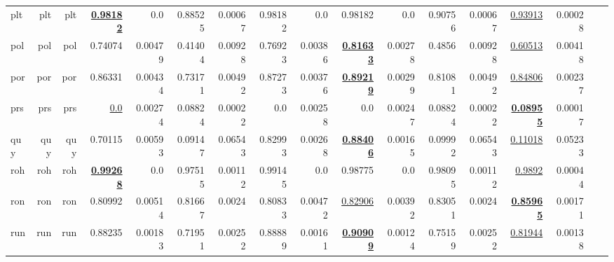 \documentclass[11pt]{article}
\begin{document}
\begin{table*}[h]
{\begin{tabular}{lrrrrrrrrrrrrrrrr}
plt         & plt         & plt         & \textbf{\underline{0.98182}}         & 0.0         & 0.88525         & 0.00067         & 0.98182         & 0.0         & 0.98182         & 0.0         & 0.90756         & 0.00067         & \underline{0.93913}         & 0.00028         \\
pol         & pol         & pol         & 0.74074         & 0.00479         & 0.41404         & 0.00928         & 0.76923         & 0.00386         & \textbf{\underline{0.81633}}         & 0.00278         & 0.4856         & 0.00928         & \underline{0.60513}         & 0.00418         \\
por         & por         & por         & 0.86331         & 0.00434         & 0.73171         & 0.00492         & 0.87273         & 0.00376         & \textbf{\underline{0.89219}}         & 0.00299         & 0.81081         & 0.00492         & \underline{0.84806}         & 0.00237         \\
prs         & prs         & prs         & \underline{0.0}         & 0.00274         & 0.08824         & 0.00022         & 0.0         & 0.00258         & 0.0         & 0.00247         & 0.08824         & 0.00022         & \textbf{\underline{0.08955}}         & 0.00017         \\
quy         & quy         & quy         & 0.70115         & 0.00593         & 0.09147         & 0.06543         & 0.82993         & 0.00268         & \textbf{\underline{0.88406}}         & 0.00165         & 0.09992         & 0.06543         & \underline{0.11018}         & 0.05233         \\
roh         & roh         & roh         & \textbf{\underline{0.99268}}         & 0.0         & 0.97515         & 0.00112         & 0.99145         & 0.0         & 0.98775         & 0.0         & 0.98095         & 0.00112         & \underline{0.9892}         & 0.00044         \\
ron         & ron         & ron         & 0.80992         & 0.00514         & 0.81667         & 0.0024         & 0.80833         & 0.00472         & \underline{0.82906}         & 0.00392         & 0.83051         & 0.0024         & \textbf{\underline{0.85965}}         & 0.00171         \\
run         & run         & run         & 0.88235         & 0.00183         & 0.71951         & 0.00252         & 0.88889         & 0.00161         & \textbf{\underline{0.90909}}         & 0.00124         & 0.75159         & 0.00252         & \underline{0.81944}         & 0.00138         \\

\end{tabular}}
\end{table*}
\end{document}
